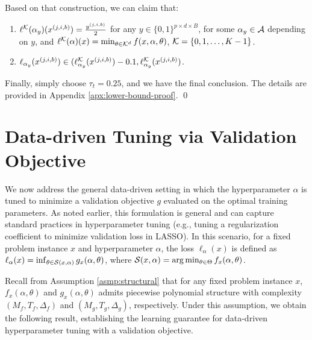 \documentclass{article}
\theoremstyle{plain}
\theoremstyle{definition}
\theoremstyle{remark}
\begin{document}
        Based on that construction, we can claim that:
        \begin{enumerate}[leftmargin=*]
            \item $\ell^{\mathcal{K}}(\alpha_{y})(x^{(j, i, b)}) = \frac{y^{(j, i, b)}}{2}$ for any $y \in \{0, 1\}^{p \times d \times B}$, for some $\alpha_y \in \mathcal{A}$ depending on $y$, and $\ell^{\mathcal{K}}(\alpha)(x) = \min_{\theta \in \mathcal{K}^d} f(x, \alpha, \theta)$, $\mathcal{K} = \{0, 1, \dots, K - 1\}$. 

            \item $\ell_{\alpha_y}(x^{(j, i, b)}) \in (\ell^{\mathcal{K}}_{\alpha_y}(x^{(j, i, b)}) - 0.1, \ell^{\mathcal{K}}_{\alpha_y}(x^{(j, i, b)})$.
        \end{enumerate}
        Finally, simply choose $\tau_t = 0.25$, and we have the final conclusion. The details are provided in Appendix \ref{apx:lower-bound-proof}.
    \qed
    

\section{Data-driven Tuning via Validation Objective} \label{sec:tuning-validation}
We now address the general data-driven setting in which the hyperparameter $\alpha$ is tuned to minimize a validation objective $g$ evaluated on the optimal training parameters. As noted earlier, this formulation is general and can capture standard practices in hyperparameter tuning (e.g., tuning a regularization coefficient to minimize validation loss in LASSO). In this scenario, for a fixed problem instance $x$ and hyperparameter $\alpha$, the loss $\ell_\alpha(x)$ is defined as $\ell_\alpha(x) = \inf_{\theta \in \mathcal{S}(x, \alpha)} g_x(\alpha, \theta)$, where $\mathcal{S}(x, \alpha) = \arg \min_{\theta \in \Theta}f_x(\alpha, \theta)$.

Recall from Assumption \ref{asmp:structural} that for any fixed problem instance $x$, $f_x(\alpha, \theta)$ and $g_x(\alpha, \theta)$ admits piecewise polynomial structure with complexity $(M_f, T_f, \Delta_f)$ and $(M_g, T_g, \Delta_g)$, respectively. Under this assumption, we obtain the following result, establishing the learning guarantee for data-driven hyperparameter tuning with a validation objective. 
\end{document}
